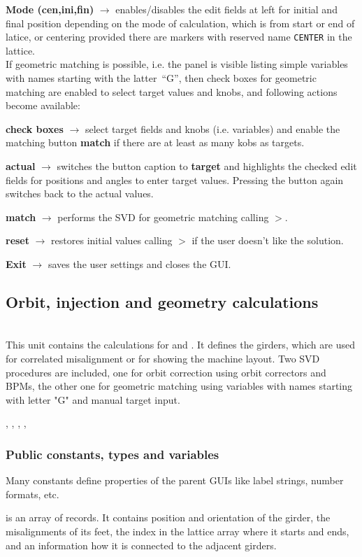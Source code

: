 \documentclass[12pt]{article}
\newcommand\code[1]{{\tt #1}}
\newcommand{\ofld}[1]{\colorbox{black!15}{{{\color{black}\bf #1}}}}
\newcommand\guico[1]{{\color{blue}\code{#1}}}
\newcommand{\unico}[1]{{\color{burntorange}\code{#1}}}
\newcommand{\evcod}[2]{\ofld{#1} $\rightarrow$ \guico{#2}}
\newcommand{\prcod}[2]{\opauni{#1}$>$\unico{#2}}
\newcommand{\opagui}[1]{\colorbox{blue!20}{{\color{black}\code{#1}}}}
\newcommand{\ogui}[1]{\hyperref[#1]{\opagui{#1}}}
\newcommand{\opauni}[1]{\colorbox{orange!30}{{\color{black}\code{#1}}}}
\newcommand{\ounih}[2]{\subsection{\label{#2}#1}{\Huge\opauni{#2}}\\}
\newcommand{\ouni}[1]{\hyperref[#1]{\opauni{#1}}}
\newcommand{\uses}[1]{\flushleft {\bf Uses:} #1}
\newcommand{\desc}[1]{#1}
\newcommand{\pvar}[1]{\subsubsection*{Public constants, types and variables} #1}
\begin{document}
\evcod{Mode (cen,ini,fin)}{rbdrawClick} enables/disables the edit fields at left for initial and final position depending on the mode of calculation, which is from start or end of latice, or centering provided there are markers with reserved name \code{CENTER} in the lattice.\\[1ex]

If geometric matching is possible, i.e. the panel \guico{PanMat} is visible listing simple variables with names starting with the latter~``G'', then check boxes for geometric matching are enabled to select target values and knobs, and following actions become available:

\evcod{check boxes}{chkg\_Click, chkgvar\_Click} select target fields and knobs (i.e. variables) and enable the matching button \ofld{match} if there are at least as many kobs as targets.

\evcod{actual}{butGoalClick} switches the button caption to \ofld{target} and highlights the checked edit fields for positions and angles to enter target values. Pressing the button again switches back to the actual values.

\evcod{match}{butMatClick} performs the SVD for geometric matching calling \prcod{georblib}{gmat\_ini,gmat\_step}. 

\evcod{reset}{butResetClick} restores initial values calling \prcod{georblib}{gmat\_reset}  if the user doesn't like the solution.

\evcod{Exit}{butExClick} saves the user settings and closes the GUI.





\ounih{Orbit, injection and geometry calculations}{georblib}

\desc{This unit contains the calculations for \ogui{opaorbit} and \ogui{opageometry}. It defines the girders, which are used for correlated misalignment or for showing the machine layout. Two SVD procedures are included, one for orbit correction using orbit correctors and BPMs, the other one for geometric matching using variables with names starting with letter "G" and manual target input.}

\uses{\ouni{globlib}, \ouni{linoplib}, \ouni{elemlib}, \ouni{mathlib}, \ouni{comauxlib}}

\pvar{}

Many constants define properties of the parent GUIs like label strings, number formats, etc. 

\unico{Girder} is an array of \unico{GirderType} records. It contains position and orientation of the girder, the misalignments of its feet, the index in the lattice array where it starts and ends, and an information how it is connected to the adjacent girders. 
\end{document}
